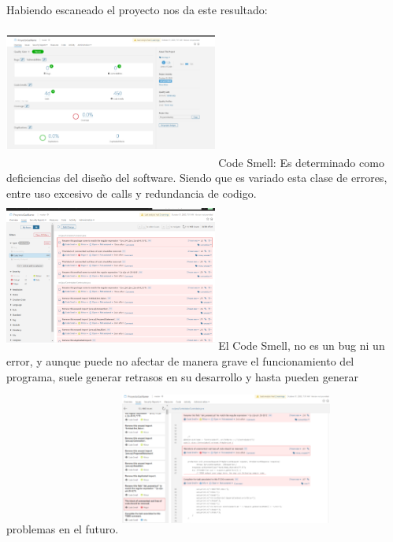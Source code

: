 \documentclass[twoside,twocolumn]{article}
\begin{document}
Habiendo escaneado el proyecto nos da este resultado: 
\newline
\newline
\includegraphics[width=7cm, height=5cm]{Image/1.png}
\newline
\newline
Code Smell: Es determinado como deficiencias del diseño del software. Siendo que es variado esta clase de errores, entre uso excesivo de calls y redundancia de codigo. 
\newline
\newline
\includegraphics[width=7cm, height=5cm]{Image/2.png}
\newline
\newline
El Code Smell, no es un bug ni un error, y aunque puede no afectar de manera grave el funcionamiento del programa, suele generar retrasos en su desarrollo y hasta pueden generar problemas en el futuro. 
\newline
\newline
\includegraphics[width=7cm, height=5cm]{Image/3.png}
\newline
\end{document}
